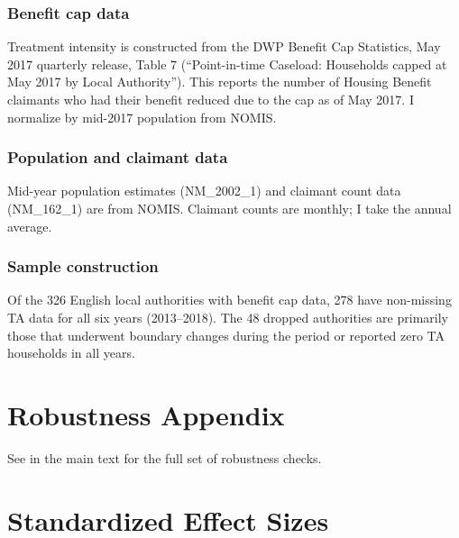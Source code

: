 \documentclass[12pt]{article}
\begin{document}
\subsubsection*{Benefit cap data} Treatment intensity is constructed from the DWP Benefit Cap Statistics, May 2017 quarterly release, Table 7 (``Point-in-time Caseload: Households capped at May 2017 by Local Authority''). This reports the number of Housing Benefit claimants who had their benefit reduced due to the cap as of May 2017. I normalize by mid-2017 population from NOMIS.

\subsubsection*{Population and claimant data} Mid-year population estimates (NM\_2002\_1) and claimant count data (NM\_162\_1) are from NOMIS. Claimant counts are monthly; I take the annual average.

\subsubsection*{Sample construction} Of the 326 English local authorities with benefit cap data, 278 have non-missing TA data for all six years (2013--2018). The 48 dropped authorities are primarily those that underwent boundary changes during the period or reported zero TA households in all years.

\section{Robustness Appendix}

See  in the main text for the full set of robustness checks.

\section{Standardized Effect Sizes}
\label{sec:sde}


\end{document}
